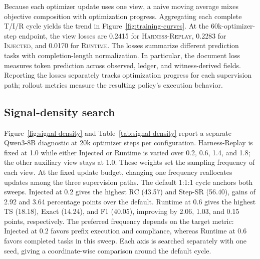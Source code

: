 \documentclass{article}
\newcommand{\replayaction}{\textsc{Harness-Replay}}
\newcommand{\injected}{\textsc{Injected}}
\newcommand{\runtime}{\textsc{Runtime}}
\begin{document}
Because each optimizer update uses one view, a naive moving average mixes
objective composition with optimization progress. Aggregating each complete
T/I/R cycle yields the trend in Figure~\ref{fig:training-curves}. At the 60k-optimizer-step endpoint, the
view losses are 0.2415 for \replayaction{}, 0.2283 for \injected{}, and
0.0170 for \runtime{}. The losses summarize different prediction tasks with completion-length
normalization. In particular, the document loss measures token prediction
across observed, ledger, and witness-derived fields. Reporting the losses
separately tracks optimization progress for each supervision path;
rollout metrics measure the resulting policy's execution behavior.

\subsection{Signal-density search}

Figure~\ref{fig:signal-density} and Table~\ref{tab:signal-density} report a
separate Qwen3-8B diagnostic at 20k optimizer steps per configuration.
Harness-Replay is fixed at 1.0 while either Injected or Runtime is varied over
0.2, 0.6, 1.4, and 1.8; the other auxiliary view stays at 1.0. These weights
set the sampling frequency of each view. At the fixed update budget, changing
one frequency reallocates updates among the three supervision paths. The
default 1:1:1 cycle anchors both sweeps.
Injected at 0.2 gives the highest RC (43.57) and Step-SR (56.40), gains of
2.92 and 3.64 percentage points over the default. Runtime at 0.6 gives the
highest TS (18.18), Exact (14.24), and F1 (40.05), improving by 2.06, 1.03,
and 0.15 points, respectively. The preferred frequency depends on the target
metric: Injected at 0.2 favors prefix execution and compliance, whereas
Runtime at 0.6 favors completed tasks in this sweep. Each axis is searched
separately with one seed, giving a coordinate-wise comparison around the
default cycle.
\end{document}
